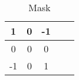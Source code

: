 \begin{enumerate}
  
\begin{table}[h!]
\centering
\begin{tabular}{|c|c|c|c|c|}
\hline
1 & 0 & -1 \\
\hline
0 & 0 & 0 \\
\hline
-1 & 0 & 1 \\
\hline
\end{tabular}
\caption{Mask}
\end{table}
\end{enumerate}



